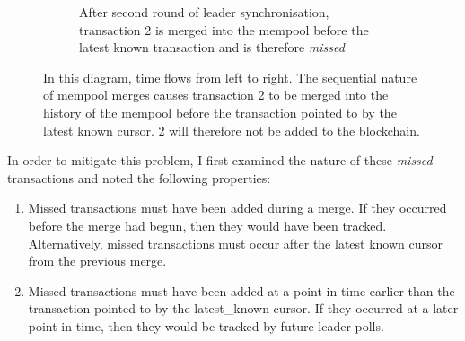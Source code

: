 \documentclass[12pt,a4paper,twoside,openright]{report}
\begin{document}
\begin{figure}
\begin{subfigure}[b]{0.45\textwidth}
					\caption{After second round of leader synchronisation, transaction 2 is merged into the mempool before the latest known transaction and is therefore \textit{missed}}
				\end{subfigure}
				\caption{In this diagram, time flows from left to right. 
				The sequential nature of mempool merges causes transaction 2 to be merged into the history of the mempool before the transaction pointed to by the latest known cursor. 
				2 will therefore not be added to the blockchain.}	
				\label{fig:readremotepartudpatesbroke}
			\end{figure}

			In order to mitigate this problem, I first examined the nature of these \textit{missed} transactions and noted the following properties:
			\begin{enumerate}
				\item Missed transactions must have been added during a merge. If they occurred before the merge had begun, then they would have been tracked. 
				Alternatively, missed transactions must occur after the latest known cursor from the previous merge. 
				\item Missed transactions must have been added at a point in time earlier than the transaction pointed to by the latest\_known cursor. 
				If they occurred at a later point in time, then they would be tracked by future leader polls.
			\end{enumerate}
\end{document}
